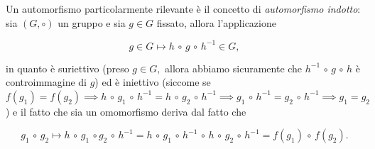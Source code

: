 Un automorfismo particolarmente rilevante è il concetto di \emph{automorfismo indotto}: sia $(G, \circ)$ un gruppo e sia $g \in G$ fissato, allora l'applicazione

\begin{equation}
	g \in G \mapsto h \, \circ \, g \,  \circ \, h^{-1} \in G,
\end{equation}

in quanto è suriettivo (preso $g \in G,$ allora abbiamo sicuramente che $h^{-1} \, \circ \, g \, \circ \, h$ è controimmagine di $g$) ed è iniettivo (siccome se $f(g_1) = f(g_2) \implies 
h \, \circ \, g_1 \, \circ \, h^{-1} = h \, \circ \, g_2 \, \circ \, h^{-1} \implies g_1 \, \circ \, h^{-1} = g_2 \, \circ \, h^{-1} \implies g_1 = g_2$) e il fatto che sia un omomorfismo deriva dal fatto che

\begin{equation}
	g_1 \, \circ \, g_2 \mapsto h \, \circ \, g_1 \, \circ g_2 \, \circ \, h^{-1} = h \, \circ \, g_1 \, \circ \, h^{-1} \, \circ \, h \, \circ \, g_2 \, \circ \, h^{-1} = f(g_1) \, \circ \, f(g_2). 
\end{equation}
